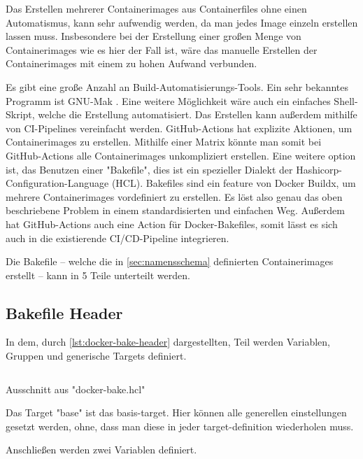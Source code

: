 Das Erstellen mehrerer Containerimages aus Containerfiles ohne einen Automatismus, kann sehr aufwendig werden, da man jedes Image einzeln erstellen lassen muss. Insbesondere bei der Erstellung einer großen Menge von Containerimages wie es hier der Fall ist, wäre das manuelle Erstellen der Containerimages mit einem zu hohen Aufwand verbunden. 

Es gibt eine große Anzahl an Build-Automatisierungs-Tools. Ein sehr bekanntes Programm ist GNU-Mak \cite{GNUMake}. Eine weitere Möglichkeit wäre auch ein einfaches Shell-Skript, welche die Erstellung automatisiert. Das Erstellen kann außerdem mithilfe von CI-Pipelines vereinfacht werden. GitHub-Actions hat explizite Aktionen, um Containerimages zu erstellen. Mithilfe einer Matrix könnte man somit bei GitHub-Actions alle Containerimages unkompliziert erstellen. Eine weitere option ist, das Benutzen einer "Bakefile", dies ist ein spezieller Dialekt der Hashicorp-Configuration-Language (HCL). Bakefiles sind ein feature von Docker Buildx, um mehrere Containerimages vordefiniert zu erstellen. Es löst also genau das oben beschriebene Problem in einem standardisierten und einfachen Weg. Außerdem hat GitHub-Actions auch eine Action für Docker-Bakefiles, somit lässt es sich auch in die existierende CI/CD-Pipeline integrieren. 

Die Bakefile – welche die in \cref{sec:namensschema} definierten Containerimages erstellt – kann in 5 Teile unterteilt werden.


\subsection{Bakefile Header}

In dem, durch \cref{lst:docker-bake-header} dargestellten, Teil werden Variablen, Gruppen und generische Targets definiert.

\begin{listing}[H]
    \inputminted[firstline=1,lastline=7]{./lexers/docker-bake-lexer.py}{./code-examples/docker-bake.hcl}
    \caption{Ausschnitt aus "docker-bake.hcl"}
    \label{lst:docker-bake-header}
\end{listing}

Das Target "base" ist das basis-target. Hier können alle generellen einstellungen gesetzt werden, ohne, dass man diese in jeder target-definition wiederholen muss. 

Anschließen werden zwei Variablen definiert. 


